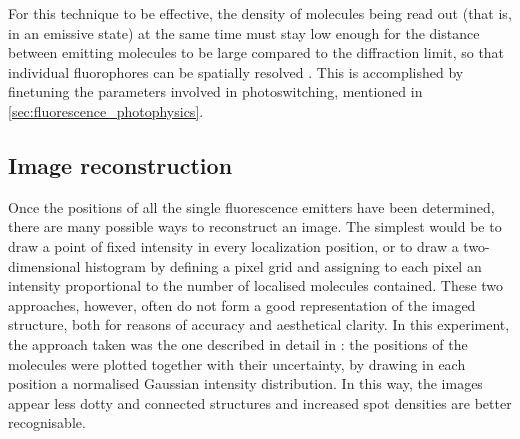 For this technique to be effective, the density of molecules being read out
(that is, in an emissive state) at the same time must stay low
enough for the distance between emitting molecules to be large
compared to the diffraction limit, so that individual fluorophores
can be spatially resolved \cite{furstenberg_single-molecule_2013}.
This is accomplished by finetuning the parameters involved in photoswitching, mentioned in \autoref{sec:fluorescence_photophysics}.

\subsection{Image reconstruction}
Once the positions of all the single fluorescence emitters have been determined, there are many possible ways to reconstruct an image.
The simplest would be to draw a point of fixed intensity in every localization position, or to draw a two-dimensional histogram by defining a pixel grid and assigning to each pixel an intensity proportional to the number of localised molecules contained.
These two approaches, however, often do not form a good representation of the imaged structure, both for reasons of accuracy and aesthetical clarity.
In this experiment, the approach taken was the one described in detail in \cite{martens_raw_2022}:
the positions of the molecules were plotted together with their uncertainty, by drawing in each position a normalised Gaussian intensity distribution.
In this way, the images appear less dotty and connected structures and increased spot densities are better recognisable.

